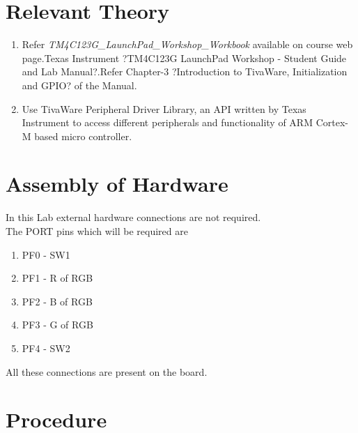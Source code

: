 \documentclass[a4paper,12pt,oneside]{book}
\begin{document}
\section {Relevant Theory}
\begin{enumerate}
\item Refer \textit {TM4C123G\_LaunchPad\_Workshop\_Workbook} available on course web page.Texas Instrument ?TM4C123G
LaunchPad Workshop - Student Guide and Lab Manual?.Refer Chapter-3
?Introduction to TivaWare, Initialization and GPIO? of the Manual.
\item Use TivaWare Peripheral Driver Library, an API written by Texas Instrument to
access different peripherals and functionality of ARM Cortex-M based micro controller. 
\end{enumerate}
\newpage
\section{Assembly of Hardware}
In this Lab external hardware connections are not required.\\
The PORT pins which will be required are 
\begin{enumerate}
\item PF0 - SW1
\item PF1 - R of RGB
\item PF2 - B of RGB
\item PF3 - G of RGB
\item PF4 - SW2
\end{enumerate}
All these connections are present on the board.
\section {Procedure}

\end{document}
